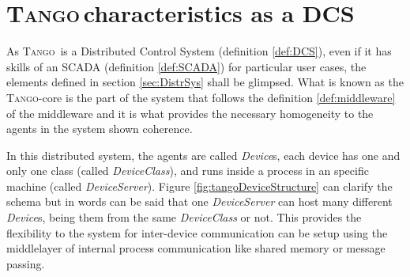 \documentclass[10pt,a4paper,twoside]{llncs}
\newcommand{\ok}[1]{``#1'' [\texttt{\color{green}OK}]}
\newcommand{\tango}{\textsc{Tango}}
\begin{document}
\section{\tango\,characteristics as a DCS}\label{sec:characteristics}


As \tango\, is a Distributed Control System (definition \ref{def:DCS}), even if it has skills of an SCADA (definition \ref{def:SCADA}) for particular user cases, the elements defined in section \ref{sec:DistrSys} shall be glimpsed. What is known as the \tango-core is the part of the system that follows the definition \ref{def:middleware} of the middleware and it is what provides the necessary homogeneity to the agents in the system shown coherence.

In this distributed system, the agents are called \emph{Device}s, each device has one and only one class (called \emph{DeviceClass}), and runs inside a process in an specific machine (called \emph{DeviceServer}). Figure \ref{fig:tangoDeviceStructure} can clarify the schema but in words can be said that one \emph{DeviceServer} can host many different \emph{Device}s, being them from the same \emph{DeviceClass} or not. This provides the flexibility to the system for inter-device communication can be setup using the middlelayer of internal process communication like shared memory or message passing.
\end{document}
